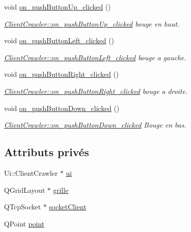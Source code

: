 \begin{DoxyCompactItemize}
void \hyperlink{class_client_crawler_a832bf9d34a93b10784f3564be2346adf}{on\+\_\+push\+Button\+Up\+\_\+clicked} ()
\begin{DoxyCompactList}\small\item\em \hyperlink{class_client_crawler_a832bf9d34a93b10784f3564be2346adf}{Client\+Crawler\+::on\+\_\+push\+Button\+Up\+\_\+clicked} bouge en haut. \end{DoxyCompactList}\item 
void \hyperlink{class_client_crawler_aadabe491ca10e5499026d3b1b0de99a9}{on\+\_\+push\+Button\+Left\+\_\+clicked} ()
\begin{DoxyCompactList}\small\item\em \hyperlink{class_client_crawler_aadabe491ca10e5499026d3b1b0de99a9}{Client\+Crawler\+::on\+\_\+push\+Button\+Left\+\_\+clicked} bouge a gauche. \end{DoxyCompactList}\item 
void \hyperlink{class_client_crawler_a4deee7315beda4b1c67baf0801512dcc}{on\+\_\+push\+Button\+Right\+\_\+clicked} ()
\begin{DoxyCompactList}\small\item\em \hyperlink{class_client_crawler_a4deee7315beda4b1c67baf0801512dcc}{Client\+Crawler\+::on\+\_\+push\+Button\+Right\+\_\+clicked} bouge a droite. \end{DoxyCompactList}\item 
void \hyperlink{class_client_crawler_a3f9ad2ca60a388d5d3d0436af7dd3756}{on\+\_\+push\+Button\+Down\+\_\+clicked} ()
\begin{DoxyCompactList}\small\item\em \hyperlink{class_client_crawler_a3f9ad2ca60a388d5d3d0436af7dd3756}{Client\+Crawler\+::on\+\_\+push\+Button\+Down\+\_\+clicked} Bouge en bas. \end{DoxyCompactList}\end{DoxyCompactItemize}
\subsection*{Attributs privés}
\begin{DoxyCompactItemize}
\item 
Ui\+::\+Client\+Crawler $\ast$ \hyperlink{class_client_crawler_a6263947f12b0ca34753f4cbb43d6d4fd}{ui}
\item 
Q\+Grid\+Layout $\ast$ \hyperlink{class_client_crawler_ac32bb3ac1812334a2232d462f65e28d2}{grille}
\item 
Q\+Tcp\+Socket $\ast$ \hyperlink{class_client_crawler_a7796ea05089d10bd1c5a6158b8cd8c89}{socket\+Client}
\item 
Q\+Point \hyperlink{class_client_crawler_acbc6c229a23b06f5e60b1845c687e513}{point}
\end{DoxyCompactItemize}


